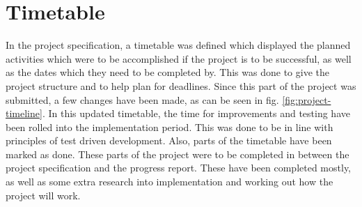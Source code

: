 \documentclass{report}
\begin{document}
\section{Timetable}
In the project specification, a timetable was defined which displayed the planned activities which were to be accomplished if the project is to be successful, as well as the dates which they need to be completed by. This was done to give the project structure and to help plan for deadlines. Since this part of the project was submitted, a few changes have been made, as can be seen in fig. \ref{fig:project-timeline}. In this updated timetable, the time for improvements and testing have been rolled into the implementation period. This was done to be in line with principles of test driven development. Also, parts of the timetable have been marked as done. These parts of the project were to be completed in between the project specification and the progress report. These have been completed mostly, as well as some extra research into implementation and working out how the project will work.
\end{document}
